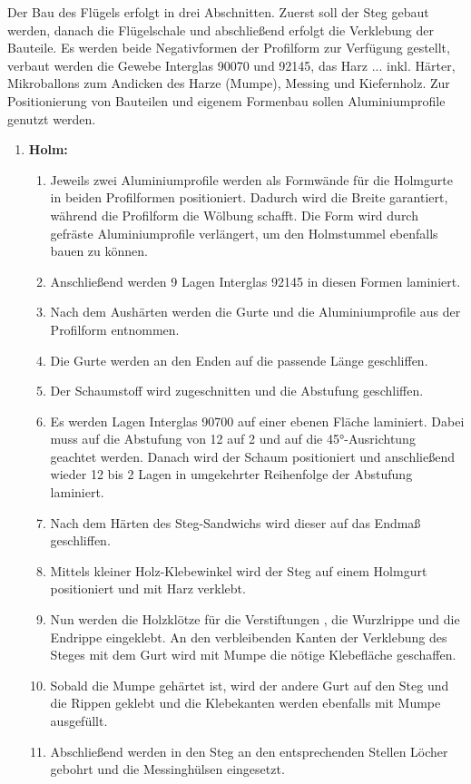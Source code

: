 Der Bau des Flügels erfolgt in drei Abschnitten. Zuerst soll der Steg gebaut werden, danach die Flügelschale und abschließend erfolgt die Verklebung der Bauteile.
Es werden beide Negativformen der Profilform zur Verfügung gestellt, verbaut werden die Gewebe Interglas 90070 und 92145, das Harz ... inkl. Härter, Mikroballons zum Andicken des Harze (Mumpe), Messing und Kiefernholz. Zur Positionierung von Bauteilen und eigenem Formenbau sollen Aluminiumprofile genutzt werden.

\begin{enumerate}
	\item \textbf{Holm:}
	\begin{enumerate}
		\item Jeweils zwei Aluminiumprofile werden als Formwände für die Holmgurte in beiden Profilformen positioniert. Dadurch wird die Breite garantiert, während die Profilform die Wölbung schafft. Die Form wird durch gefräste Aluminiumprofile verlängert, um den Holmstummel ebenfalls bauen zu können. 
		\item Anschließend werden 9 Lagen Interglas 92145 in diesen Formen laminiert. 
		\item Nach dem Aushärten werden die Gurte und die Aluminiumprofile aus der Profilform entnommen. 
		\item Die Gurte werden an den Enden auf die passende Länge geschliffen.
		\item Der Schaumstoff wird zugeschnitten und die Abstufung geschliffen.
		\item Es werden Lagen Interglas 90700 auf einer ebenen Fläche laminiert. Dabei muss auf die Abstufung von 12 auf 2 und auf die 45°-Ausrichtung geachtet werden. Danach wird der Schaum positioniert und anschließend wieder 12 bis 2 Lagen in umgekehrter Reihenfolge der Abstufung laminiert.
		\item Nach dem Härten des Steg-Sandwichs wird dieser auf das Endmaß geschliffen.
		\item Mittels kleiner Holz-Klebewinkel wird der Steg auf einem Holmgurt positioniert und mit Harz verklebt.
		\item Nun werden die Holzklötze für die Verstiftungen , die Wurzlrippe und die Endrippe eingeklebt. An den verbleibenden Kanten der Verklebung des Steges mit dem Gurt wird mit Mumpe die nötige Klebefläche geschaffen.
		\item Sobald die Mumpe gehärtet ist, wird der andere Gurt auf den Steg und die Rippen geklebt und die Klebekanten werden ebenfalls mit Mumpe ausgefüllt.
		\item Abschließend werden in den Steg an den entsprechenden Stellen Löcher gebohrt und die Messinghülsen eingesetzt.

\end{enumerate}
\end{enumerate}
